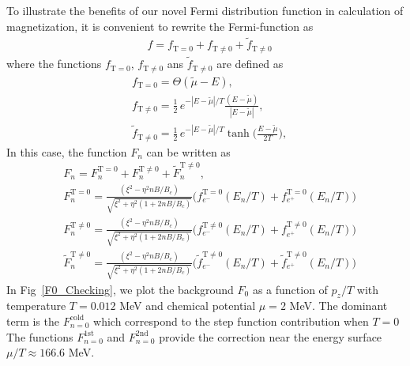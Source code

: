 \documentclass[sn-mathphys,Numbered]{sn-jnl}
\theoremstyle{thmstyleone}%
\theoremstyle{thmstyletwo}%
\theoremstyle{thmstylethree}%
\begin{document}
To illustrate the benefits of our novel Fermi distribution function in calculation of magnetization, it is convenient to rewrite the Fermi-function as 
\begin{align}
&f=f_{\mathrm{T=0}}+f_\mathrm{T\neq0}+\tilde f_\mathrm{T\neq0}
\end{align}
where the functions $f_{\mathrm{T=0}}$, $f_\mathrm{T\neq0}$ ans $\tilde f_\mathrm{T\neq0}$ are defined as
\begin{align}
&f_{\mathrm{T=0}}=\Theta(\tilde\mu-E),\\
&f_\mathrm{T\neq0}=\frac{1}{2}\,e^{-|E-\tilde\mu|/T}\frac{(E-\tilde\mu)}{|E-\tilde\mu|},\\ 
&\tilde f_\mathrm{T\neq0}=\frac{1}{2}\,e^{-|E-\tilde\mu|/T}\tanh\bigg(\frac{E-\tilde\mu}{2T}\bigg),
\end{align}
In this case, the function $F_n$ can be written as
\begin{align}
&F_n=F_n^{\mathrm{T=0}}+F_n^{\mathrm{T\neq0}}+\widetilde F_n^{\mathrm{T\neq0}},\\
&F_n^{\mathrm{T=0}}=\frac{(\xi^2-\eta^2nB/B_c)}{\sqrt{\xi^2+\eta^2\left(1+2nB/B_c\right)}}\bigg(f^{\mathrm{T=0}}_{e^-}(E_n/T)+f^{\mathrm{T=0}}_{e^+}(E_n/T)\bigg)\\
&F_n^{\mathrm{T\neq0}}=\frac{(\xi^2-\eta^2nB/B_c)}{\sqrt{\xi^2+\eta^2\left(1+2nB/B_c\right)}}\bigg(f^{\mathrm{T\neq0}}_{e^-}(E_n/T)+f^{\mathrm{T\neq0}}_{e^+}(E_n/T)\bigg)\\
&\widetilde F_n^{\mathrm{T\neq0}}=\frac{(\xi^2-\eta^2nB/B_c)}{\sqrt{\xi^2+\eta^2\left(1+2nB/B_c\right)}}\bigg(\tilde f^{\mathrm{T\ne0}}_{e^-}(E_n/T)+\tilde f^{\mathrm{T\neq0}}_{e^+}(E_n/T)\bigg)
\end{align}
In Fig~\ref{F0_Checking}, we plot the background  $F_0$ as a function of $p_z/T$ with temperature $T=0.012$ MeV and chemical potential $\mu=2$ MeV. The dominant term is the $F_{n=0}^{\mathrm{cold}}$ which correspond to the step function contribution when $T=0$ The functions $F_{n=0}^{\mathrm{1st}}$ and $F_{n=0}^{\mathrm{2nd}}$ provide the correction near the energy surface $\mu/T\approx166.6$ MeV.
\end{document}
